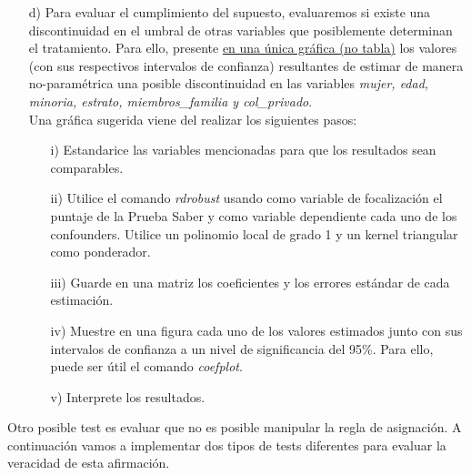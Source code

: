 \documentclass[a4paper]{article}
\begin{document}
\begin{itemize}
    \item[d)] Para evaluar el cumplimiento del supuesto, evaluaremos si existe una discontinuidad en el umbral de otras variables que posiblemente determinan el tratamiento. Para ello, presente \underline{en una única gráfica (no tabla)} los valores (con sus respectivos intervalos de confianza) resultantes de estimar de manera no-paramétrica una posible discontinuidad en las variables \emph{mujer, edad, minoria, estrato, miembros\_familia y col\_privado}.\\
    
    Una gráfica sugerida viene del realizar los siguientes pasos:
    
    \begin{itemize}
        \item[i)]  Estandarice las variables mencionadas para que los resultados sean comparables.
        
        \item[ii)] Utilice el comando \emph{rdrobust} usando como variable de focalización el puntaje de la Prueba Saber y como variable dependiente cada uno de los confounders.  Utilice un polinomio local de grado 1 y un kernel triangular como ponderador.
        
        \item[iii)] Guarde en una matriz los coeficientes y los errores estándar de cada estimación.
        
        \item[iv)] Muestre en una figura  cada uno de los valores estimados junto con sus intervalos de confianza a un nivel de significancia del 95\%. Para ello, puede ser útil el comando \emph{coefplot}.
        
        \item[v)] Interprete los resultados.
    \end{itemize}
    
\end{itemize}


Otro posible test es evaluar que no es posible manipular la regla de asignación. A continuación vamos a implementar dos tipos de tests diferentes para evaluar la veracidad de esta afirmación.
\end{document}
